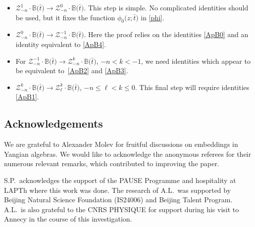 \documentclass[10pt,a4paper]{amsart}
\newcommand{\bt}{{\bar t}}
\theoremstyle{definition}
\def\BB{{\mathbb{B}}}
\def\r#1{\eqref{#1}}
\def\Z{\mathcal{Z}}
\begin{document}
\begin{itemize}\itemsep=0pt
\item $\Z^1_{-n}\cdot\BB\bigl(\bt\bigr)\to \Z^0_{-n}\cdot\BB\bigl(\bt\bigr)$.
This step is simple. No complicated identities should be used, but it fixes the
function $\phi_0\bigl(z;\bt\bigr)$ in \r{phi}.
\item $\Z^0_{-n}\cdot\BB\bigl(\bt\bigr)\to \Z^{-1}_{-n}\cdot\BB\bigl(\bt\bigr)$.
Here the proof relies on the identities
\r{ApB0} and an identity equivalent to \r{ApB4}.
 \item For $\Z^{-1}_{-n}\cdot\BB\bigl(\bt\bigr)\to \Z^k_{-n}\cdot\BB\bigl(\bt\bigr)$, $-n<k< -1$,
 we need identities which appear to be equivalent to~\r{ApB2} and \r{ApB3}.
\item $\Z^k_{-n}\cdot\BB\bigl(\bt\bigr)\to \Z^k_{\ell}\cdot\BB\bigl(\bt\bigr)$, $-n\leq \ell< k\leq 0$.
This final step will require identities \r{ApB1}.
\end{itemize}



\subsection*{Acknowledgements}
We are grateful to Alexander Molev for fruitful discussions on embeddings in Yangian algebras.
We would like to acknowledge the anonymous referees for their numerous relevant remarks, which contributed to improving the paper.

S.P.~acknowledges the support of the PAUSE Programme and hospitality at LAPTh where
this work was done.
The research of A.L.\ was supported by Beijing Natural Science Foundation (IS24006) and Beijing Talent Program.
A.L.\ is also grateful to the CNRS PHYSIQUE for support during his visit to
Annecy in the course of this investigation.




\end{document}
